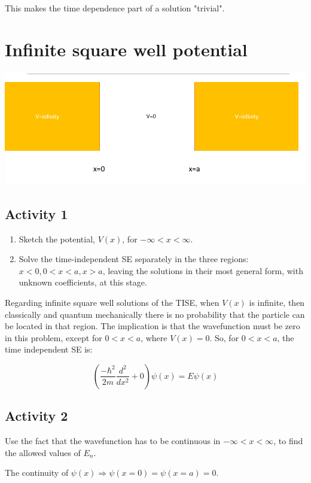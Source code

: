 \documentclass{article}
\begin{document}
This makes the time dependence part of a solution "trivial". 

\section{Infinite square well potential}

\includegraphics[width = 0.8 \textwidth]{Lecture05/4.png}

\subsection{Activity 1}

\begin{enumerate}
    \item Sketch the potential, $V(x)$, for $- \infty < x < \infty$. 
    \item Solve the time-independent SE separately in the three regions: $x < 0, 0 < x < a, x > a$, leaving the solutions in their most general form, with unknown coefficients, at this stage. 
\end{enumerate}

Regarding infinite square well solutions of the TISE, when $V(x)$ is infinite, then classically and quantum mechanically there is no probability that the particle can be located in that region. The implication is that the wavefunction must be zero in this problem, except for $0 < x < a$, where $V(x) = 0$. So, for $0 < x < a$, the time independent SE is:

$$\left( \frac{- \hbar^2}{2m} \frac{d^2}{dx^2} + 0 \right) \psi(x) = E \psi(x)$$

\subsection{Activity 2}

Use the fact that the wavefunction has to be continuous in $- \infty < x < \infty$, to find the allowed values of $E_n$. 

The continuity of $\psi(x) \Rightarrow \psi(x = 0) = \psi(x= a) = 0$. 
\end{document}
